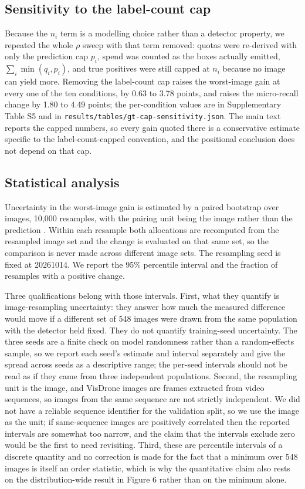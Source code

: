 \documentclass[sn-mathphys,Numbered]{sn-jnl}
\begin{document}
\subsection{Sensitivity to the label-count cap}

Because the $n_i$ term is a modelling choice rather than a detector property, we repeated the whole $\rho$ sweep with that term removed: quotas were re-derived with only the prediction cap $p_i$, spend was counted as the boxes actually emitted, $\sum_i \min(q_i, p_i)$, and true positives were still capped at $n_i$ because no image can yield more. Removing the label-count cap raises the worst-image gain at every one of the ten conditions, by 0.63 to 3.78 points, and raises the micro-recall change by 1.80 to 4.49 points; the per-condition values are in Supplementary Table S5 and in \texttt{results/tables/gt-cap-sensitivity.json}. The main text reports the capped numbers, so every gain quoted there is a conservative estimate specific to the label-count-capped convention, and the positional conclusion does not depend on that cap.

\subsection{Statistical analysis}

Uncertainty in the worst-image gain is estimated by a paired bootstrap over images, 10,000 resamples, with the pairing unit being the image rather than the prediction \cite{efron1993bootstrap}. Within each resample both allocations are recomputed from the resampled image set and the change is evaluated on that same set, so the comparison is never made across different image sets. The resampling seed is fixed at 20261014. We report the 95\% percentile interval and the fraction of resamples with a positive change.

Three qualifications belong with those intervals. First, what they quantify is image-resampling uncertainty: they answer how much the measured difference would move if a different set of 548 images were drawn from the same population with the detector held fixed. They do not quantify training-seed uncertainty. The three seeds are a finite check on model randomness rather than a random-effects sample, so we report each seed's estimate and interval separately and give the spread across seeds as a descriptive range; the per-seed intervals should not be read as if they came from three independent populations. Second, the resampling unit is the image, and VisDrone images are frames extracted from video sequences, so images from the same sequence are not strictly independent. We did not have a reliable sequence identifier for the validation split, so we use the image as the unit; if same-sequence images are positively correlated then the reported intervals are somewhat too narrow, and the claim that the intervals exclude zero would be the first to need revisiting. Third, these are percentile intervals of a discrete quantity and no correction is made for the fact that a minimum over 548 images is itself an order statistic, which is why the quantitative claim also rests on the distribution-wide result in Figure 6 rather than on the minimum alone.
\end{document}
